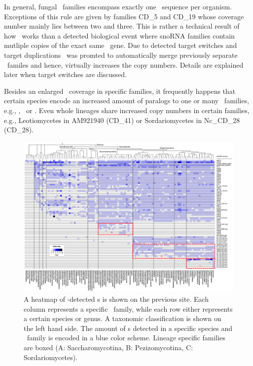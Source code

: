 In general, fungal \sno\ families encompass exactly one \sno\ sequence
per organism. Exceptions of this rule are given by 
families CD\_5 and CD\_19 whose coverage number mainly lies between two and
three. This is rather a technical result of how \snostrip\ works than a
detected biological event where snoRNA families contain mutliple
copies of the exact same \sno\ gene. Due to detected target
switches and target duplications \snostrip\ was promted to
automatically merge previously separate \sno\ familes and hence,
virtually increases the copy numbers. Details are explained
later when target switches are discussed. 

Besides an enlarged
\sno\ coverage in specific families, it frequently happens that
certain species encode an increased amount of paralogs to one or
many \sno\ families, e.g., \Ppl, \Asp\ or \Nfu. Even
whole lineages share increased copy numbers in certain families, e.g., 
Leotiomycetes in AM921940 (CD\_41) or Sordariomycetes in Nc\_CD\_28 (CD\_28).

\begin{figure}
  \centering
  \includegraphics[width=1.05\textwidth]{pics/CD_snoRNAs_collapsed.short_naming.eps}
  \caption{A heatmap of
    \snostrip-detected \cd s is shown on the previous site. Each column represents a specific \sno\
    family, while each row either represents a certain species or
    genus. A taxonomic classification is shown on the left hand side. The amount of
    \sno s detected in a specific species and \sno\ family is encoded in a
    blue color scheme. Lineage specific families are boxed (A:
    Saccharomycotina, B: Pezizomycotina, C: Sordariomycetes). %
  }
  \label{fig:heatmap_CD_snoRNAs} 
\end{figure}



